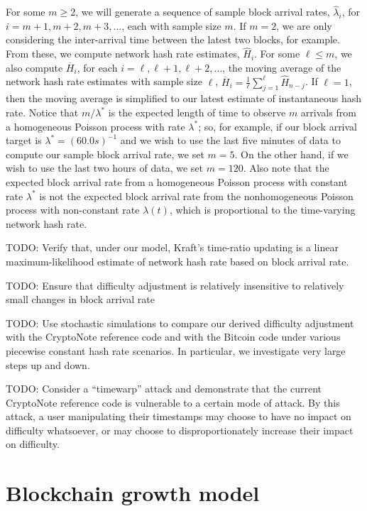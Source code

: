 \documentclass[12pt,english]{mrl}
\theoremstyle{definition}
\renewcommand{\geq}{\geqslant}
\renewcommand{\leq}{\leqslant}
\numberwithin{equation}{section}
\numberwithin{figure}{section}
\numberwithin{equation}{section}
\numberwithin{equation}{section}
\numberwithin{figure}{section}
\begin{document}
For some $m \geq 2$, we will generate a sequence of sample block arrival rates, $\hat{\lambda}_{i}$, for $i=m+1, m+2, m+3, \ldots$, each with sample size $m$. If $m=2$, we are only considering the inter-arrival time between the latest two blocks, for example. From these, we compute network hash rate estimates, $\hat{H}_i$. For some $\ell \leq m$, we also compute $\overline{H}_i$, for each $i = \ell, \ell+1, \ell+2, \ldots$, the moving average of the network hash rate estimates with sample size $\ell$, $\overline{H}_i = \frac{1}{\ell}\sum_{j=1}^{\ell} \hat{H}_{n-j}$. If $\ell = 1$, then the moving average is simplified to our latest estimate of instantaneous hash rate. Notice that $m/\lambda^*$ is the expected length of time to observe $m$ arrivals from a homogeneous Poisson process with rate $\lambda^*$; so, for example, if our block arrival target is $\lambda^{*} = (60.0 s)^{-1}$ and we wish to use the last five minutes of data to compute our sample block arrival rate, we set $m=5$. On the other hand, if we wish to use the last two hours of data, we set $m=120$. Also note that the expected block arrival rate from a homogeneous Poisson process with constant rate $\lambda^*$ is not the expected block arrival rate from the nonhomogeneous Poisson process with non-constant rate $\lambda(t)$, which is proportional to the time-varying network hash rate.


TODO: Verify that, under our model, Kraft's time-ratio updating is a linear maximum-likelihood estimate of network hash rate based on block arrival rate.

TODO: Ensure that difficulty adjustment is relatively insensitive to relatively small changes in block arrival rate

TODO:  Use stochastic simulations to compare our derived difficulty adjustment with the CryptoNote reference code and with the Bitcoin code under various piecewise constant hash rate scenarios. In particular, we investigate very large steps up and down. 

TODO: Consider a ``timewarp'' attack and demonstrate that the current CryptoNote reference code is vulnerable to a certain mode of attack. By this attack, a user manipulating their timestamps may choose to have no impact on difficulty whatsoever, or may choose to disproportionately increase their impact on difficulty.

\section{Blockchain growth model}\label{modelDef}
\end{document}
